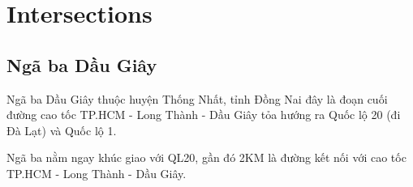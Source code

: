 \chapter{Intersections}

\section{Ngã ba Dầu Giây}

Ngã ba Dầu Giây thuộc huyện Thống Nhất, tỉnh Đồng Nai đây là đoạn cuối đường cao tốc TP.HCM - Long Thành - Dầu Giây tỏa hướng ra Quốc lộ 20 (đi Đà Lạt) và Quốc lộ 1.

Ngã ba nằm ngay khúc giao với QL20, gần đó 2KM là đường kết nối với cao tốc TP.HCM - Long Thành - Dầu Giây.
